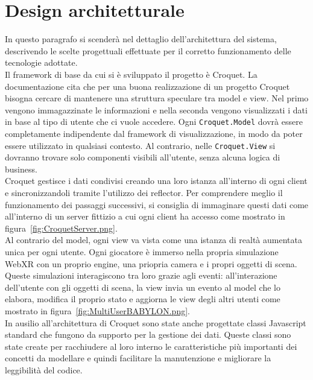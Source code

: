 \section{Design architetturale}\label{sec:design}
In questo paragrafo si scenderà nel dettaglio dell'architettura del sistema, descrivendo le scelte progettuali effettuate per il corretto funzionamento delle tecnologie adottate.\\
\newline
Il framework di base da cui si è sviluppato il progetto è Croquet. La documentazione cita che per una buona realizzazione di un progetto Croquet bisogna cercare di mantenere una 
struttura speculare tra model e view. Nel primo vengono immagazzinate le informazioni e nella seconda vengono visualizzati i dati in base al tipo di utente che ci vuole accedere.
Ogni \texttt{Croquet.Model} dovrà essere completamente indipendente dal framework di visualizzazione, in modo da poter essere utilizzato in qualsiasi contesto. Al contrario, nelle
\texttt{Croquet.View} si dovranno trovare solo componenti visibili all'utente, senza alcuna logica di business.\\
Croquet gestisce i dati condivisi creando una loro istanza all'interno di ogni client e sincronizzandoli tramite l'utilizzo dei reflector. Per comprendere meglio il funzionamento
dei passaggi successivi, si consiglia di immaginare questi dati come all'interno di un server fittizio a cui ogni client ha accesso come mostrato in figura~\ref{fig:CroquetServer.png}.\\
Al contrario del model, ogni view va vista come una istanza di realtà aumentata unica per ogni utente. Ogni giocatore è immerso nella propria simulazione WebXR con un proprio engine,
una priopria camera e i propri oggetti di scena. Queste simulazioni interagiscono tra loro grazie agli eventi: all'interazione dell'utente con gli oggetti di scena, la view invia un
evento al model che lo elabora, modifica il proprio stato e aggiorna le view degli altri utenti come mostrato in figura~\ref{fig:MultiUserBABYLON.png}.\\
\newline
In ausilio all'architettura di Croquet sono state anche progettate classi Javascript standard che fungono da supporto per la gestione dei dati. Queste classi sono state create per 
racchiudere al loro interno le caratteristiche più importanti dei concetti da modellare e quindi facilitare la manutenzione e migliorare la leggibilità del codice.\\
